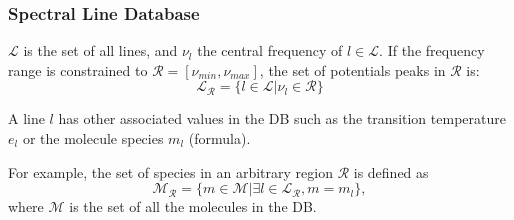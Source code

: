 \documentclass[slidestop,compress,mathserif,color,12pt]{beamer}
\begin{document}
\begin{frame}
  \frametitle{Spectral Line Database}
\scriptsize
\begin{minipage}{0.65\linewidth}
$\mathcal{L}$ is the set of all lines,
and $\nu_l$ the central frequency of $l \in \mathcal{L}$.
If the frequency range is constrained to
$\mathcal{R}=[\nu_{min},\nu_{max}]$, 
the set of potentials peaks in $\mathcal{R}$ is:
\begin{equation*}
\mathcal{L}_\mathcal{R} = \{ l \in \mathcal{L} | \nu_l \in \mathcal{R} \}
\end{equation*}

A line $l$ has other associated values in the DB 
such as the transition temperature $e_l$ or the molecule species $m_l$ (formula).

For example, the set of species in an arbitrary region $\mathcal{R}$ 
is defined as
\begin{equation*}
\mathcal{M}_\mathcal{R} = \{ m \in \mathcal{M} | \exists l \in
\mathcal{L}_\mathcal{R}, m=m_l \},
\end{equation*}
where $\mathcal{M}$ is the set of all the molecules in the DB.


\end{minipage}
\end{frame}
\end{document}
